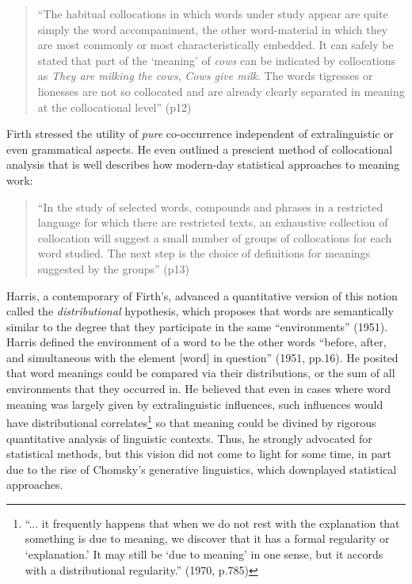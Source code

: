 \documentclass[man,floatsintext]{apa6}
\begin{document}
\begin{quote}
  ``The habitual collocations in which words under study appear are quite simply the word accompaniment, the other word-material in which they are most commonly or most characteristically embedded. It can safely be stated that part of the `meaning' of \emph{cows} can be indicated by collocations as \emph{They are milking the cows}, \emph{Cows give milk}. The words tigresses or lionesses are not so collocated and are already clearly separated in meaning at the collocational level'' (p12)
\end{quote}

Firth stressed the utility of \emph{pure} co-occurrence independent of extralinguistic or even grammatical aspects. He even outlined a prescient method of collocational analysis that is well describes how modern-day statistical approaches to meaning work:
\begin{quote}
  ``In the study of selected words, compounds and phrases in a restricted language for which there are restricted texts, an exhaustive collection of collocation will suggest a small number of groups of collocations for each word studied. The next step is the choice of definitions for meanings suggested by the groups'' (p13)
\end{quote}

Harris, a contemporary of Firth's, advanced a quantitative version of this notion called the \emph{distributional} hypothesis, which proposes that words are semantically similar to the degree that they participate in the same ``environments'' (1951). Harris defined the environment of a word to be the other words ``before, after, and simultaneous with the element [word] in question'' (1951, pp.16). He posited that word meanings could be compared via their distributions, or the sum of all environments that they occurred in. He believed that even in cases where word meaning was largely given by extralinguistic influences, such influences would have distributional correlates\footnote{``... it frequently happens that when we do not rest with the explanation that something is due to meaning, we discover that it has a formal regularity or `explanation.' It may still be `due to meaning' in one sense, but it accords with a distributional regularity.'' (1970, p.785)} so that meaning could be divined by rigorous quantitative analysis of linguistic contexts. Thus, he strongly advocated for statistical methods, but this vision did not come to light for some time, in part due to the rise of Chomsky's generative linguistics, which downplayed statistical approaches.
\end{document}
